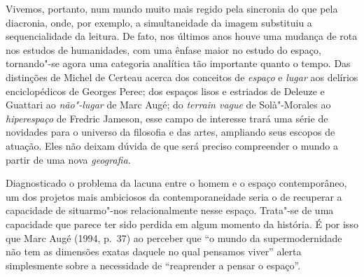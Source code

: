 Vivemos, portanto, num mundo muito mais regido pela sincronia do que
pela diacronia, onde, por exemplo, a simultaneidade da imagem substituiu
a sequencialidade da leitura. De fato, nos últimos anos houve uma
mudança de rota nos estudos de humanidades, com uma ênfase maior no
estudo do espaço, tornando"-se agora uma categoria analítica tão
importante quanto o tempo. Das distinções de Michel de Certeau acerca
dos conceitos de \emph{espaço} e \emph{lugar} aos delírios
enciclopédicos de Georges Perec; dos espaços lisos e estriados de
Deleuze e Guattari ao \emph{não"-lugar} de Marc Augé; do \emph{terrain
vague} de Solà"-Morales ao \emph{hiperespaço} de Fredric Jameson, esse
campo de interesse trará uma série de novidades para o universo da
filosofia e das artes, ampliando seus escopos de atuação. Eles não
deixam dúvida de que será preciso compreender o mundo a partir de uma
nova \emph{geografia}.

Diagnosticado o problema da lacuna entre o homem e o espaço
contemporâneo, um dos projetos mais ambiciosos da contemporaneidade
seria o de recuperar a capacidade de situarmo"-nos relacionalmente nesse
espaço. Trata"-se de uma capacidade que parece ter sido perdida em algum
momento da história. É por isso que Marc Augé (1994, p.~37) ao perceber que ``o mundo
da supermodernidade não tem as dimensões exatas daquele no qual
pensamos viver'' alerta simplesmente sobre a necessidade de
``reaprender a pensar o espaço''.

